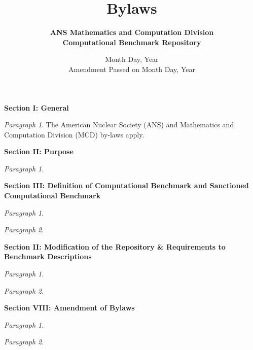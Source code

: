 \setlength{\oddsidemargin}{0.1truein}
\setlength{\topmargin}{-.3truein}
\setlength{\textwidth}{6.3truein}
\setlength{\textheight}{8truein}
%
\title{\bf Bylaws}
\date{Month Day, Year \\
Amendment Passed on Month Day, Year}
\author{\bf ANS Mathematics and Computation Division 
\\ Computational Benchmark Repository \vspace{2in}
} 


\maketitle
\nopagebreak

\begin{center} {\bf Section I:    General} \end{center}
{\em Paragraph 1}. The American Nuclear Society (ANS) and Mathematics and Computation Division (MCD) by-laws apply.

\begin{center} {\bf Section II:    Purpose} \end{center}
{\em Paragraph 1}.  

\begin{center} {\bf Section III:     Definition of Computational Benchmark and Sanctioned Computational Benchmark} \end{center}

{\em Paragraph 1}. 

{\em Paragraph 2}. 

\begin{center} {\bf Section II:     Modification of the Repository \& Requirements to Benchmark Descriptions} \end{center}

{\em Paragraph 1}.

{\em Paragraph 2}. 


\begin{center} {\bf Section VIII:    Amendment of Bylaws} \end{center}

{\em Paragraph 1}.  

{\em Paragraph 2}.  



